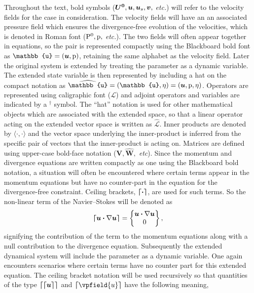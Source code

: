Throughout the text, bold symbols ($\boldsymbol{U^{0}},\boldsymbol{u},\boldsymbol{u}_{s},\boldsymbol{v},$ \textit{etc.}) will refer to the velocity fields for the case in consideration. The velocity fields will have an an associated pressure field which ensures the divergence-free evolution of the velocities, which is denoted in Roman font ($\mathrm{P^{0}}, \mathrm{p},$ \textit{etc.}). The two fields will often appear together in equations, so the pair is represented compactly using the Blackboard bold font as $\mathbb{u} = (\vfield{u},\pfield{p})$, retaining the same alphabet as the velocity field. Later the original system is extended by treating the parameter as a dynamic variable. The extended state variable is then represented by including a hat on the compact notation as $\widehat{\mathbb{u}} = (\mathbb{u},\eta) = (\vfield{u},\pfield{p},\eta)$. Operators are represented using caligraphic font ($\mathcal{L}$) and adjoint operators and variables are indicated by a $^{\dagger}$ symbol. The ``hat'' notation is used for other mathematical objects which are associated with the extended space, so that a linear operator acting on the extended vector space is written as $\mathcal{\widehat{L}}$. Inner products are denoted by $\langle\cdot,\cdot\rangle$ and the vector space underlying the inner-product is inferred from the specific pair of vectors that the inner-product is acting on. Matrices are defined using upper-case bold-face notation ($\mathbf{V},\mathbf{\widehat{W}},$ \textit{etc}). 
Since the momentum and divergence equations are written compactly as one using the Blackboard bold notation, a situation will often be encountered where certain terms appear in the momentum equations but have no counter-part in the equation for the divergence-free constraint. Ceiling brackets, $\boldsymbol{\lceil} \boldsymbol{\cdot} \boldsymbol{\rceil}$, are used for such terms. So the non-linear term of the Navier--Stokes will be denoted as
\begin{equation}
	\boldsymbol{\lceil} \boldsymbol{u}\boldsymbol{\cdot}\nabla\boldsymbol{u} \boldsymbol{\rceil} =
	\begin{Bmatrix}
		\boldsymbol{u}\boldsymbol{\cdot}\nabla\boldsymbol{u} \\
		\mathrm{0}
	\end{Bmatrix}, \nonumber
\end{equation}
signifying the contribution of the term to the momentum equations along with a null contribution to the divergence equation. Subsequently the extended dynamical system will include the parameter as a dynamic variable. One again encounters scenarios where certain terms have no counter part for this extended equation. The ceiling bracket notation will be used recursively so that quantities of the type $\boldsymbol{\lceil} \boldsymbol{\lceil} \boldsymbol{u} \boldsymbol{\rceil}\boldsymbol{\rceil}$ and $\blbracket\vpfield{u}\brbracket$ have the following meaning,
